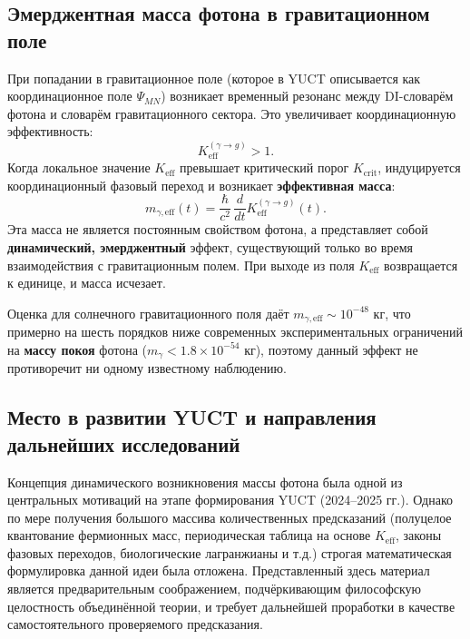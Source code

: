 \documentclass[12pt,a4paper]{article}
\begin{document}
\subsection{Эмерджентная масса фотона в гравитационном поле}

При попадании в гравитационное поле (которое в YUCT описывается как координационное поле \(\Psi_{MN}\)) возникает временный резонанс между DI-словарём фотона и словарём гравитационного сектора. Это увеличивает координационную эффективность:
\begin{equation}
	K_{\mathrm{eff}}^{(\gamma\to g)} > 1.
\end{equation}
Когда локальное значение \(K_{\mathrm{eff}}\) превышает критический порог \(K_{\mathrm{crit}}\), индуцируется координационный фазовый переход и возникает \textbf{эффективная масса}:
\begin{equation}
	m_{\gamma,\mathrm{eff}}(t) = \frac{\hbar}{c^2}\,\frac{d}{dt}K_{\mathrm{eff}}^{(\gamma\to g)}(t).
\end{equation}
Эта масса не является постоянным свойством фотона, а представляет собой \textbf{динамический, эмерджентный} эффект, существующий только во время взаимодействия с гравитационным полем. При выходе из поля \(K_{\mathrm{eff}}\) возвращается к единице, и масса исчезает.

Оценка для солнечного гравитационного поля даёт \(m_{\gamma,\mathrm{eff}}\sim 10^{-48}\) кг, что примерно на шесть порядков ниже современных экспериментальных ограничений на \textbf{массу покоя} фотона (\(m_\gamma < 1.8\times10^{-54}\) кг), поэтому данный эффект не противоречит ни одному известному наблюдению.

\subsection{Место в развитии YUCT и направления дальнейших исследований}

Концепция динамического возникновения массы фотона была одной из центральных мотиваций на этапе формирования YUCT (2024–2025 гг.). Однако по мере получения большого массива количественных предсказаний (полуцелое квантование фермионных масс, периодическая таблица на основе \(K_{\mathrm{eff}}\), законы фазовых переходов, биологические лагранжианы и т.д.) строгая математическая формулировка данной идеи была отложена. Представленный здесь материал является предварительным соображением, подчёркивающим философскую целостность объединённой теории, и требует дальнейшей проработки в качестве самостоятельного проверяемого предсказания.
\end{document}
